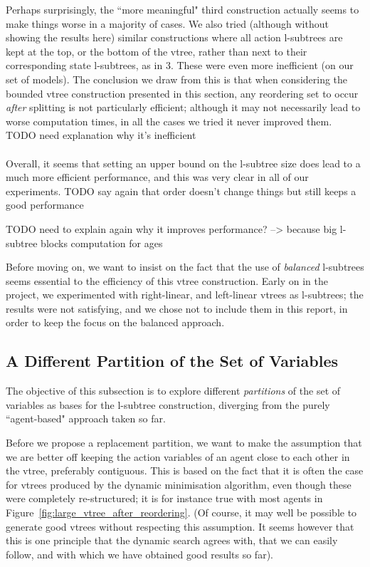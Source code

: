 \documentclass[11pt]{report}
\begin{document}
Perhaps surprisingly, the ``more meaningful" third construction actually seems to make things worse in a majority of cases. We also tried (although without showing the results here) similar constructions where all action l-subtrees are kept at the top, or the bottom of the vtree, rather than next to their corresponding state l-subtrees, as in 3. These were even more inefficient (on our set of models).
 The conclusion we draw from this is that when considering the bounded vtree construction presented in this section, any reordering set to occur \textit{after} splitting is not particularly efficient; although it may not necessarily lead to worse computation times, in all the cases we tried it never improved them. TODO need explanation why it's inefficient
 \\\\
Overall, it seems that setting an upper bound on the l-subtree size does lead to a much more efficient performance, and this was very clear in all of our experiments. 	TODO say again that order doesn't change things but still keeps a good performance
 
TODO need to explain again why it improves performance? --> because big l-subtree blocks computation for ages

Before moving on, we want to insist on the fact that the use of \textit{balanced} l-subtrees seems essential to the efficiency of this vtree construction. Early on in the project, we experimented with right-linear, and left-linear vtrees as l-subtrees; the results were not satisfying, and we chose not to include them in this report, in order to keep the focus on the balanced approach.

\subsection{A Different Partition of the Set of Variables}

The objective of this subsection is to explore different \textit{partitions} of the set of variables as bases for the l-subtree construction, diverging from the purely ``agent-based" approach taken so far. 

Before we propose a replacement partition, we want to make the assumption that we are better off keeping the action variables of an agent close to each other in the vtree, preferably contiguous. This is based on the fact that it is often the case for vtrees produced by the dynamic minimisation algorithm, even though these were completely re-structured; it is for instance true with most agents in
 Figure~\ref{fig:large_vtree_after_reordering}.
(Of course, it may well be possible to generate good vtrees without respecting this assumption. It seems however that this is one principle that the dynamic search agrees with, that we can easily follow, and with which we have obtained good results so far).
\end{document}

